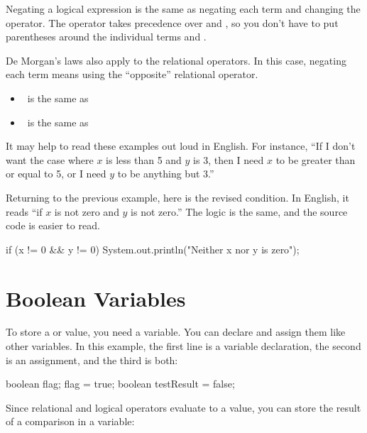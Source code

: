 Negating a logical expression is the same as negating each term and changing the operator.
The \java{!} operator takes precedence over \java{&&} and \java{||}, so you don't have to put parentheses around the individual terms  and .

De Morgan's laws also apply to the relational operators.
In this case, negating each term means using the ``opposite'' relational operator.

\begin{itemize}
\item {} ~is the same as~ 
\item {} ~is the same as~ 
\end{itemize}

It may help to read these examples out loud in English.
For instance, ``If I don't want the case where $x$ is less than 5 and $y$ is 3, then I need $x$ to be greater than or equal to 5, or I need $y$ to be anything but 3.''

Returning to the previous example, here is the revised condition.
In English, it reads ``if $x$ is not zero and $y$ is not zero.''
The logic is the same, and the source code is easier to read.

\begin{code}
if (x != 0 && y != 0) {
    System.out.println("Neither x nor y is zero");
}
\end{code}


\section{Boolean Variables}


To store a  or  value, you need a  variable.
You can declare and assign them like other variables.
In this example, the first line is a variable declaration, the second is an assignment, and the third is both:

\begin{code}
boolean flag;
flag = true;
boolean testResult = false;
\end{code}


Since relational and logical operators evaluate to a  value, you can store the result of a comparison in a variable:

